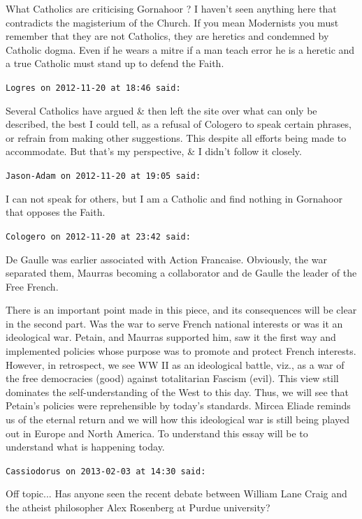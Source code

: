 \begin{footnotesize}
\begin{sffamily}
What Catholics are criticising Gornahoor ? I haven't seen anything here that contradicts the magisterium of the Church. If you mean Modernists you must remember that they are not Catholics, they are heretics and condemned by Catholic dogma. Even if he wears a mitre if a man teach error he is a heretic and a true Catholic must stand up to defend the Faith.

\hfill

\texttt{Logres on 2012-11-20 at 18:46 said:}

Several Catholics have argued \& then left the site over what can only be described, the best I could tell, as a refusal of Cologero to speak certain phrases, or refrain from making other suggestions. This despite all efforts being made to accommodate. But that's my perspective, \& I didn't follow it closely.

\hfill

\texttt{Jason-Adam on 2012-11-20 at 19:05 said:}

I can not speak for others, but I am a Catholic and find nothing in Gornahoor that opposes the Faith.

\hfill

\texttt{Cologero on 2012-11-20 at 23:42 said:}

De Gaulle was earlier associated with Action Francaise. Obviously, the war separated them, Maurras becoming a collaborator and de Gaulle the leader of the Free French.

There is an important point made in this piece, and its consequences will be clear in the second part. Was the war to serve French national interests or was it an ideological war. Petain, and Maurras supported him, saw it the first way and implemented policies whose purpose was to promote and protect French interests. However, in retrospect, we see WW II as an ideological battle, viz., as a war of the free democracies (good) against totalitarian Fascism (evil). This view still dominates the self-understanding of the West to this day. Thus, we will see that Petain's policies were reprehensible by today's standards. Mircea Eliade reminds us of the eternal return and we will how this ideological war is still being played out in Europe and North America. To understand this essay will be to understand what is happening today.

\hfill

\texttt{Cassiodorus on 2013-02-03 at 14:30 said:}

Off topic... Has anyone seen the recent debate between William Lane Craig and the atheist philosopher Alex Rosenberg at Purdue university?


\end{sffamily}
\end{footnotesize}

